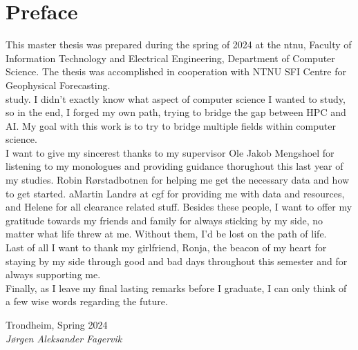 \chapter*{Preface}

This master thesis was prepared during the spring of 2024 at the \acrfull{ntnu}, Faculty of Information Technology and Electrical Engineering, Department of Computer Science. The thesis was accomplished in cooperation with NTNU SFI Centre for Geophysical Forecasting. \\

study. I didn't exactly know what aspect of computer science I wanted to study, so in the end, I forged my own path, trying to bridge the gap between HPC and AI. My goal with this work is to try to bridge multiple fields within computer science. \\

I want to give my sincerest thanks to my supervisor Ole Jakob Mengshoel for listening to my monologues and providing guidance thorughout this last year of my studies. Robin Rørstadbotnen for helping me get the necessary data and how to get started. aMartin Landrø at \acrlong{cgf} for providing me with data and resources, and Helene for all clearance related stuff. Besides these people, I want to offer my gratitude towards my friends and family for always sticking by my side, no matter what life threw at me. Without them, I'd be lost on the path of life. \\

Last of all I want to thank my girlfriend, Ronja, the beacon of my heart for staying by my side through good and bad days throughout this semester and for always supporting me. \\

Finally, as I leave my final lasting remarks before I graduate, I can only think of a few wise words regarding the future.

\begin{flushright}
Trondheim, Spring 2024  \\
\textit{Jørgen Aleksander Fagervik}
\end{flushright}